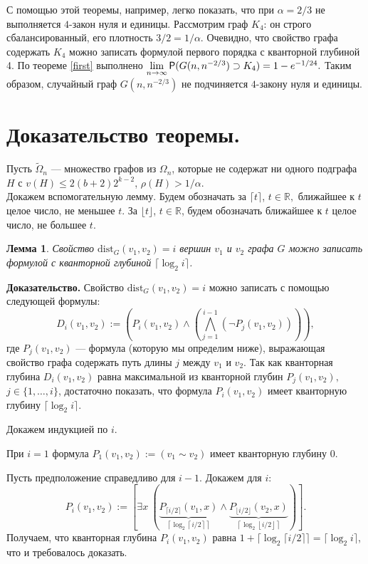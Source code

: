 \documentclass[12pt,a4paper,russian,titlepage]{article}
\newtheorem{Lem}{Лемма}
\begin{document}
С помощью этой теоремы, например, легко показать, что при $\alpha = 2/3$ не выполняется $4$-закон нуля и единицы.
Рассмотрим граф $K_{4}$: он строго сбалансированный, его плотность $3/2 = 1/\alpha.$ Очевидно, что свойство графа содержать $K_4$ можно записать формулой первого порядка с кванторной глубиной 4. По теореме \ref{first} выполнено $\lim\limits_{n\rightarrow\infty}{\sf P}(G(n,n^{-2/3})\supset K_4)=1-e^{-1/24}.$ Таким образом, случайный граф $G(n,n^{-2/3})$ не подчиняется $4$-закону нуля и единицы.



\section{Доказательство теоремы.}\label{proof_theorem}

Пусть $\tilde\Omega_n$ --- множество графов из $\Omega_n$, которые не содержат ни одного подграфа $H$ с $v(H)\leq 2(b+2)2^{k-2}$, $\rho(H)>1/\alpha$.\\


Докажем вспомогательную лемму. Будем обозначать за $\lceil t \rceil$, $t\in \mathbb{R},$ ближайшее к $t$ целое число, не меньшее $t$. За $\lfloor t \rfloor$, $t \in \mathbb{R}$, будем обозначать ближайшее к $t$ целое число, не большее $t$.

\begin{Lem}
Свойство $\mathrm{dist}_G(v_1,v_2) = i$ вершин $v_1$ и $v_2$ графа $G$ можно записать формулой с кванторной глубиной $\lceil\log_2 i\rceil$.
\label{lemma}
\end{Lem}
{\bf Доказательство.}
Свойство $\mathrm{dist}_G(v_1,v_2) = i$ можно записать с помощью следующей формулы:
$$
 D_i(v_1, v_2) := \left(P_i(v_1, v_2) \wedge \left(\bigwedge_{j = 1}^{i-1} (\neg P_j(v_1,v_2))\right)\right),
$$
где $P_j(v_1,v_2)$ --- формула (которую мы определим ниже), выражающая свойство графа содержать путь длины $j$ между $v_1$ и $v_2$. Так как кванторная глубина $D_i(v_1,v_2)$ равна максимальной из кванторной глубин $P_j(v_1,v_2),$ $j\in \{1,\dots,i\}$, достаточно показать, что формула $P_i(v_1,v_2)$ имеет кванторную глубину $\lceil\log_2 i\rceil.$

Докажем индукцией по $i$.

При $i = 1$ формула $P_{1}(v_1,v_2) := (v_1\sim v_2)$ имеет кванторную глубину 0.

Пусть предположение справедливо для $i - 1.$ Докажем для $i:$
$$
 P_i(v_1, v_2) := [\exists x\         (\underbrace{P_{\lceil i/2\rceil}(v_1, x)}_{\left\lceil \log_2 \left\lceil i/2 \right\rceil \right\rceil}        \wedge \underbrace{P_{\lfloor i/2\rfloor}(v_2, x)}_{\left\lceil \log_2\left\lfloor i/2\right\rfloor \right\rceil})].
$$
Получаем, что кванторная глубина $P_i(v_1, v_2)$ равна $1 + \lceil \log_2 \lceil i/2\rceil \rceil = \lceil\log_2 i\rceil$, что и требовалось доказать.\\
\end{document}
